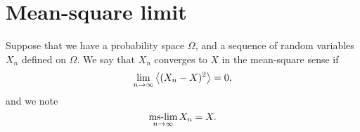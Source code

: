 \section{Mean-square limit} \label{app:mslim}
Suppose that we have a probability space $\Omega$, and a sequence of random variables $X_n$ defined on $\Omega$. We say that $X_n$ converges to $X$ in the mean-square sense if
\begin{equation}
	\lim_{n\rightarrow \infty} \left\langle (X_n-X)^2 \right\rangle = 0,
\end{equation}
and we note
\begin{equation}
	\mslim_{n\rightarrow \infty} X_n = X.
\end{equation}